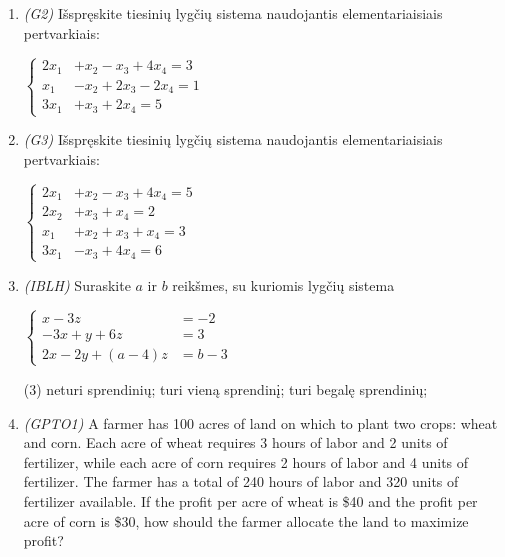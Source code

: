 \documentclass[a4paper]{article}
\begin{document}
\begin{enumerate}
      \item \textit{(G2)} Išspręskite tiesinių lygčių sistema naudojantis elementariaisiais pertvarkiais:

            $\left\{\begin{aligned}
                        2x_1 & +x_2-x_3 +4x_4    = 3 \\
                        x_1  & -x_2+2x_3 - 2x_4 = 1  \\
                        3x_1 & +x_3  +2x_4  =5
                  \end{aligned}\right.$

      \item \textit{(G3)} Išspręskite tiesinių lygčių sistema naudojantis elementariaisiais pertvarkiais:

            $\left\{\begin{aligned}
                        2x_1 & +x_2-x_3 +4x_4    = 5 \\
                        2x_2 & + x_3 + x_4 = 2       \\
                        x_1  & + x_2 +x_3  +x_4  =3  \\
                        3x_1 & -x_3  +4x_4  =6
                  \end{aligned}\right.$

            \pagebreak

      \item \textit{(IBLH)} Suraskite $a$ ir $b$ reikšmes, su kuriomis lygčių sistema

            $\left\{\begin{aligned}
                        x-3z         & = -2 \\
                        -3x + y + 6z & = 3  \\
                        2x-2y+(a-4)z & =b-3
                  \end{aligned}\right.$

            \begin{tasks}[item-format={\normalfont}, after-item-skip=4mm](3)
                  \task neturi sprendinių;
                  \task turi vieną sprendinį;
                  \task turi begalę sprendinių;
            \end{tasks}

      \item \textit{(GPTO1)} A farmer has 100 acres of land on which to plant two crops: wheat and corn.
            Each acre of wheat requires 3 hours of labor and 2 units of fertilizer, while
            each acre of corn requires 2 hours of labor and 4 units of fertilizer. The
            farmer has a total of 240 hours of labor and 320 units of fertilizer available.
            If the profit per acre of wheat is \$40 and the profit per acre of corn is \$30,
            how should the farmer allocate the land to maximize profit?


\end{enumerate}
\end{document}
